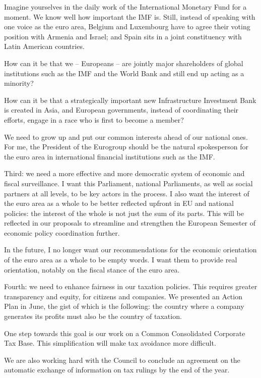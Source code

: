 \documentclass[a4paper,11pt]{article}
\begin{document}
Imagine yourselves in the daily work of the International Monetary Fund for a moment. We know well how important the IMF is. Still, instead of speaking with one voice as the euro area, Belgium and Luxembourg have to agree their voting position with Armenia and Israel; and Spain sits in a joint constituency with Latin American countries.

How can it be that we – Europeans – are jointly major shareholders of global institutions such as the IMF and the World Bank and still end up acting as a minority?

How can it be that a strategically important new Infrastructure Investment Bank is created in Asia, and European governments, instead of coordinating their efforts, engage in a race who is first to become a member?

We need to grow up and put our common interests ahead of our national ones. For me, the President of the Eurogroup should be the natural spokesperson for the euro area in international financial institutions such as the IMF.

Third: we need a more effective and more democratic system of economic and fiscal surveillance. I want this Parliament, national Parliaments, as well as social partners at all levels, to be key actors in the process. I also want the interest of the euro area as a whole to be better reflected upfront in EU and national policies: the interest of the whole is not just the sum of its parts. This will be reflected in our proposals to streamline and strengthen the European Semester of economic policy coordination further.

In the future, I no longer want our recommendations for the economic orientation of the euro area as a whole to be empty words. I want them to provide real orientation, notably on the fiscal stance of the euro area.

Fourth: we need to enhance fairness in our taxation policies. This requires greater transparency and equity, for citizens and companies. We presented an Action Plan in June, the gist of which is the following: the country where a company generates its profits must also be the country of taxation.

One step towards this goal is our work on a Common Consolidated Corporate Tax Base. This simplification will make tax avoidance more difficult.

We are also working hard with the Council to conclude an agreement on the automatic exchange of information on tax rulings by the end of the year.
\end{document}
